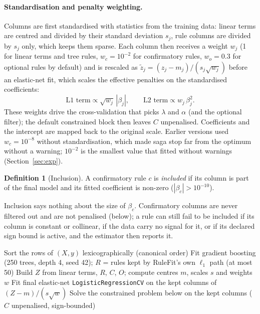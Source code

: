 \documentclass[11pt,a4paper]{article}
\theoremstyle{definition}\newtheorem{definition}{Definition}
\begin{document}
\paragraph{Standardisation and penalty weighting.} Columns are first standardised with statistics from the training data: linear terms are centred and divided by their standard deviation $s_j$, rule columns are divided by $s_j$ only, which keeps them sparse. Each column then receives a weight $w_j$ (1 for linear terms and tree rules, $w_c=10^{-2}$ for confirmatory rules, $w_o=0.3$ for optional rules by default) and is rescaled as $\tilde z_j = (z_j-m_j)/(s_j\sqrt{w_j})$ before an elastic-net fit, which scales the effective penalties on the standardised coefficients:
\[
\text{L1 term}\propto \sqrt{w_j}\,|\beta_j|,\qquad \text{L2 term}\propto w_j\,\beta_j^2 .
\]
These weights drive the cross-validation that picks $\lambda$ and $\alpha$ (and the optional filter); the default constrained block then leaves $C$ unpenalised. Coefficients and the intercept are mapped back to the original scale. Earlier versions used $w_c=10^{-8}$ without standardisation, which made saga stop far from the optimum without a warning; $10^{-2}$ is the smallest value that fitted without warnings (Section~\ref{sec:exp}).

\begin{definition}[Inclusion]\label{def:inclusion} A confirmatory rule $c$ is \emph{included} if its column is part of the final model and its fitted coefficient is non-zero ($|\beta_c|>10^{-10}$).\end{definition} Inclusion says nothing about the size of $\beta_c$. Confirmatory columns are never filtered out and are not penalised (below); a rule can still fail to be included if its column is constant or collinear, if the data carry no signal for it, or if its declared sign bound is active, and the estimator then reports it.

\begin{algorithm}[h]
\caption{\textsc{ExpertRuleFit} training}\label{alg:erf}
Sort the rows of $(X,y)$ lexicographically (canonical order)\;
Fit gradient boosting (250 trees, depth 4, seed 42); $R$ = rules kept by RuleFit's own $\ell_1$ path (at most 50)\;
Build $Z$ from linear terms, $R$, $C$, $O$; compute centres $m$, scales $s$ and weights $w$\;
Fit final elastic-net \texttt{LogisticRegressionCV} on the kept columns of $(Z-m)/(s\sqrt{w})$\;
Solve the constrained problem below on the kept columns ($C$ unpenalised, sign-bounded)\;
\end{algorithm}
\end{document}
